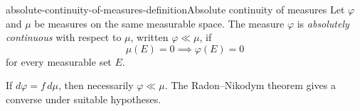 \documentclass[preview]{standalone}
\begin{document}
\begin{snippetdefinition}{absolute-continuity-of-measures-definition}{Absolute continuity of measures}
    Let \(\varphi\) and \(\mu\) be measures on the same measurable space.
    The measure \(\varphi\) is \emph{absolutely continuous} with respect to
    \(\mu\), written \(\varphi\ll\mu\), if
    \[
        \mu(E)=0\implies\varphi(E)=0
    \]
    for every measurable set \(E\).
\end{snippetdefinition}

If \(d\varphi=f\,d\mu\), then necessarily \(\varphi\ll\mu\). The
Radon--Nikodym theorem gives a converse under suitable hypotheses.
\end{document}
